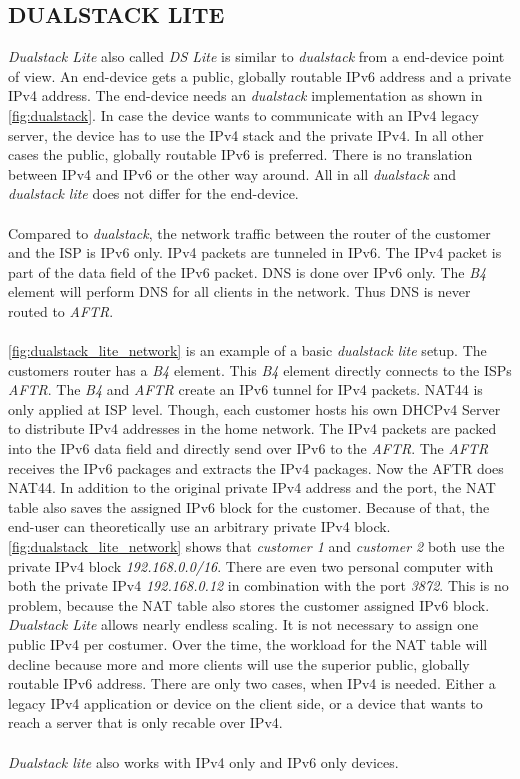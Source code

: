 \documentclass[format=sigconf, natbib=true, nonacm=true]{acmart}
\begin{document}
    \subsection{DUALSTACK LITE}
    \textit{Dualstack Lite} also called \textit{DS Lite} is similar to \textit{dualstack} from a end-device point of view. An end-device gets a public, globally routable IPv6 address and a private IPv4 address. The end-device needs an \textit{dualstack} implementation as shown in \ref{fig:dualstack}. In case the device wants to communicate with an IPv4 legacy server, the device has to use the IPv4 stack and the private IPv4. In all other cases the public, globally routable IPv6 is preferred. There is no translation between IPv4 and IPv6 or the other way around. All in all \textit{dualstack} and \textit{dualstack lite} does not differ for the end-device.\\\\Compared to \textit{dualstack}, the network traffic between the router of the customer and the ISP is IPv6 only. IPv4 packets are tunneled in IPv6. The IPv4 packet is part of the data field of the IPv6 packet. DNS is done over IPv6 only. The \textit{B4} element will perform DNS for all clients in the network. Thus DNS is never routed to \textit{AFTR}.\\\\ \ref{fig:dualstack_lite_network} is an example of a basic \textit{dualstack lite} setup. The customers router has a \textit{B4} element. This \textit{B4} element directly connects to the ISPs \textit{AFTR}. The \textit{B4} and \textit{AFTR} create an IPv6 tunnel for IPv4 packets. NAT44 is only applied at ISP level. Though, each customer hosts his own DHCPv4 Server to distribute IPv4 addresses in the home network. The IPv4 packets are packed into the IPv6 data field and directly send over IPv6 to the \textit{AFTR}. The \textit{AFTR} receives the IPv6 packages and extracts the IPv4 packages. Now the AFTR does NAT44. In addition to the original private IPv4 address and the port, the NAT table also saves the assigned IPv6 block for the customer. Because of that, the end-user can theoretically use an arbitrary private IPv4 block\cite{rfc6333}. \ref{fig:dualstack_lite_network} shows that \textit{customer 1} and \textit{customer 2} both use the private IPv4 block \textit{192.168.0.0/16}. There are even two personal computer with both the private IPv4 \textit{192.168.0.12} in combination with the port \textit{3872}. This is no problem, because the NAT table also stores the customer assigned IPv6 block. \textit{Dualstack Lite} allows nearly endless scaling. It is not necessary to assign one public IPv4 per costumer. Over the time, the workload for the NAT table will decline because more and more clients will use the superior public, globally routable IPv6 address. There are only two cases, when IPv4 is needed. Either a legacy IPv4 application or device on the client side, or a device that wants to reach a server that is only recable over IPv4.\\\\\textit{Dualstack lite} also works with IPv4 only and IPv6 only devices. 
\end{document}

